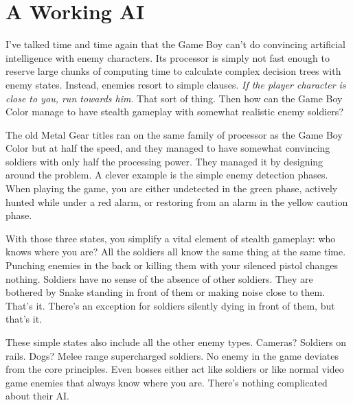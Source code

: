 \documentclass{book}
\let\oldcenter\center
\let\oldendcenter\endcenter
\renewenvironment{center}{\setlength\topsep{0pt}\oldcenter}{\oldendcenter}
\begin{document}
\FloatBarrier\needspace{10mm}\section*{A Working AI}\nopagebreak[4]

I’ve talked time and time again that the Game Boy can’t do convincing artificial intelligence with enemy characters. Its processor is simply not fast enough to reserve large chunks of computing time to calculate complex decision trees with enemy states. Instead, enemies resort to simple clauses. \emph{If the player character is close to you, run towards him}. That sort of thing. Then how can the Game Boy Color manage to have stealth gameplay with somewhat realistic enemy soldiers?

The old Metal Gear titles ran on the same family of processor as the Game Boy Color but at half the speed, and they managed to have somewhat convincing soldiers with only half the processing power. They managed it by designing around the problem. A clever example is the simple enemy detection phases. When playing the game, you are either undetected in the green phase, actively hunted while under a red alarm, or restoring from an alarm in the yellow caution phase.

\begin{center}
\quad\vspace{4pt}
\quad\vspace{4pt}
\quad\vspace{4pt}
\end{center}

With those three states, you simplify a vital element of stealth gameplay: who knows where you are? All the soldiers all know the same thing at the same time. Punching enemies in the back or killing them with your silenced pistol changes nothing. Soldiers have no sense of the absence of other soldiers. They are bothered by Snake standing in front of them or making noise close to them. That’s it. There’s an exception for soldiers silently dying in front of them, but that’s it.

These simple states also include all the other enemy types. Cameras? Soldiers on rails. Dogs? Melee range supercharged soldiers. No enemy in the game deviates from the core principles. Even bosses either act like soldiers or like normal video game enemies that always know where you are. There’s nothing complicated about their AI.
\end{document}
